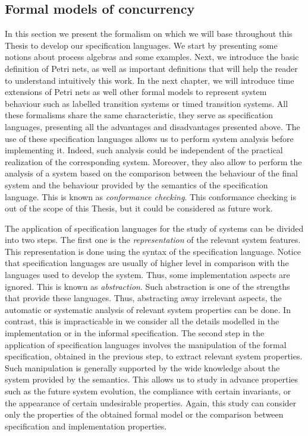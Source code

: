\subsection{Formal models of concurrency}\label{formalmodels}
In this section we present the formalism on which we will base
throughout this Thesis to develop our specification languages. We start by presenting
some notions about process algebras and some examples. Next, we introduce the basic definition of
Petri nets, as well as important definitions that will help the reader to understand intuitively this work.
In the next chapter, we will introduce time extensions of Petri nets as well other formal models to represent
system behaviour such as labelled transition systems or timed transition systems.
All these formalisms share the same characteristic, they serve as 
specification languages, presenting all the advantages and disadvantages presented above. 
The use of these specification languages allows us to perform system analysis before implementing it. 
Indeed, such analysis could be independent of the practical realization 
of the corresponding system. Moreover, they also allow to 
perform the analysis of a system based on
the comparison between the behaviour of the final system 
and the behaviour provided by the semantics of the specification language. This is known as \emph{conformance checking}.
This conformance checking is out of the scope of this Thesis, but it could be considered as future work.

The application of specification languages for the study of systems
can be divided into two steps. The first one is the \emph{representation}
of the relevant system features. This representation is done using the syntax 
of the specification language. Notice that specification languages are usually of higher level
in comparison with the languages used to develop the system. Thus,
some implementation aspects are ignored. This is known as \emph{abstraction}.
Such abstraction is one of the strengths that provide these languages. Thus, abstracting away irrelevant aspects,
the automatic or systematic analysis of relevant system properties can be done. In contrast, this is 
impracticable in we consider all the details modelled in the implementation or in the informal specification.
The second step in the application of specification languages
involves the manipulation of the formal specification, obtained in the previous step, to
extract relevant system properties. Such manipulation
is generally supported by the wide knowledge about the system provided by the semantics. 
This allows us to study in advance properties such as the future system evolution, the
compliance with certain invariants, or the appearance of certain undesirable properties. 
Again, this study can consider only the properties of the obtained formal model or the comparison
between specification and implementation properties.

